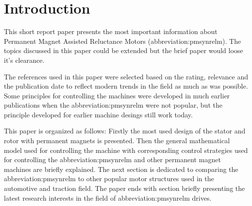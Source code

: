 \documentclass[a4paper, twoside, 11pt]{article}
\begin{document}


\newpage
{} %

\newpage




%

\null\newpage

\setcounter{page}{2}%

% 	


% 


\tableofcontents
\newpage%
\flushbottom %
\newpage
\vspace{0pt}

\listoffigures %
\flushbottom %
\newpage




\null\newpage

\setcounter{page}{1}

\section{Introduction}
This short report paper presents the most important information about Permanent Magnet Assisted Reluctance Motors (\gls{abbreviation:pmsynrelm}). The topics discussed in this paper could be extended but the brief paper would loose it's clearance.\par
The references used in this paper were selected based on the rating, relevance and the publication date to reflect modern trends in the field as much as was possible. Some principles for controlling the machines were developed in much earlier publications when the \gls{abbreviation:pmsynrelm} were not popular, but the principle developed for earlier machine desings still work today.\par
This paper is organized as follows: Firstly the most used design of the stator and rotor with permanent magnets is presented. Then the general mathematical model used for controlling the machine with corresponding control strategies used for controlling the \gls{abbreviation:pmsynrelm} and other permanent magnet machines are briefly explained. The next section is dedicated to comparing the \gls{abbreviation:pmsynrelm} to other popular motor structures used in the automotive and traction field. The paper ends with section briefly presenting the latest research interests in the field of \gls{abbreviation:pmsynrelm} drives.
\end{document}
